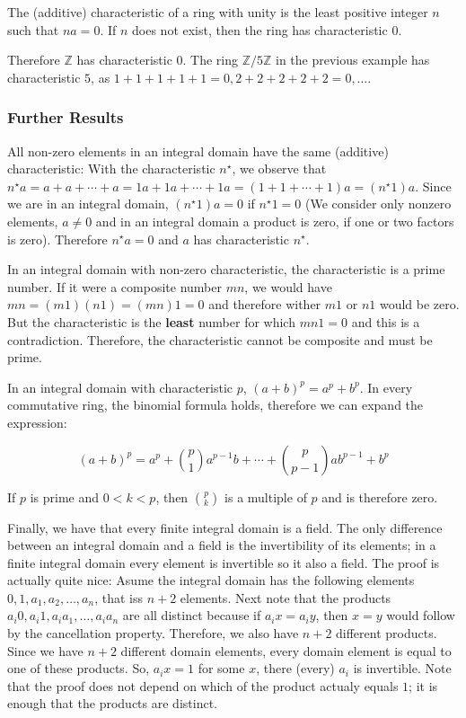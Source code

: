 The (additive) characteristic of a ring with unity is the least positive
integer \(n\) such that \(na =0\). If \(n\) does not exist, then the
ring has characteristic \(0\).

Therefore \(\mathbb{Z}\) has characteristic 0. The ring
\(\mathbb{Z}/5\mathbb{Z}\) in the previous example has characteristic
\(5\), as \(1+1+1+1+1=0, 2+2+2+2+2=0, \ldots\).

\subsubsection{Further Results}\label{further-results}

All non-zero elements in an integral domain have the same (additive)
characteristic: With the characteristic \(n^\star\), we observe that
\(n^\star a = a +a + \cdots + a = 1a + 1a + \cdots + 1a = (1+1+\cdots+1)a = (n^\star 1)a\).
Since we are in an integral domain, \((n^\star 1)a=0\) if
\(n^\star 1=0\) (We consider only nonzero elements, \(a \neq 0\) and in
an integral domain a product is zero, if one or two factors is zero).
Therefore \(n^\star a=0\) and \(a\) has characteristic \(n^\star\).

In an integral domain with non-zero characteristic, the characteristic
is a prime number. If it were a composite number \(mn\), we would have
\(mn = (m1)(n1) = (mn)1 = 0\) and therefore wither \(m1\) or \(n1\)
would be zero. But the characteristic is the \textbf{least} number for
which \(mn1=0\) and this is a contradiction. Therefore, the
characteristic cannot be composite and must be prime.

In an integral domain with characteristic \(p\),
\((a+b)^p = a^p + b^p\). In every commutative ring, the binomial formula
holds, therefore we can expand the expression:

\[
(a+b)^p = a^p + {p \choose 1} a^{p-1} b + \cdots + {p \choose p-1} a b^{p-1} + b^p
\]

If \(p\) is prime and \(0 < k < p\), then \({p \choose k}\) is a
multiple of \(p\) and is therefore zero.

Finally, we have that every finite integral domain is a field. The only
difference between an integral domain and a field is the invertibility
of its elements; in a finite integral domain every element is invertible
so it also a field. The proof is actually quite nice: Asume the integral
domain has the following elements \(0, 1, a_1, a_2, \ldots,a_n\), that
iss \(n+2\) elements. Next note that the products
\(a_i 0, a_i 1, a_i a_1, \ldots, a_i a_n\) are all distinct because if
\(a_i x = a_i y\), then \(x=y\) would follow by the cancellation
property. Therefore, we also have \(n+2\) different products. Since we
have \(n+2\) different domain elements, every domain element is equal to
one of these products. So, \(a_i x = 1\) for some \(x\), there (every)
\(a_i\) is invertible. Note that the proof does not depend on which of
the product actualy equals \(1\); it is enough that the products are
distinct.
